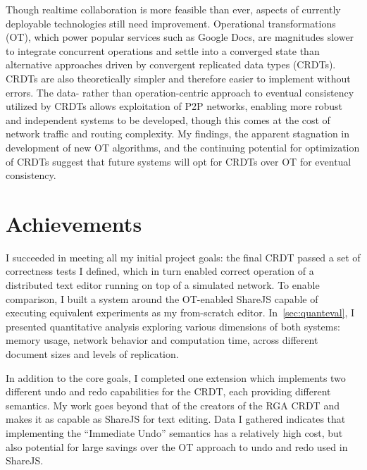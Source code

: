 \documentclass[12pt,a4paper,twoside,openright]{report}
\begin{document}
Though realtime collaboration is more feasible than ever, aspects of currently deployable technologies still need improvement. Operational transformations (OT), which power popular services such as Google Docs, are magnitudes slower to integrate concurrent operations and settle into a converged state than alternative approaches driven by convergent replicated data types (CRDTs). CRDTs are also theoretically simpler and therefore easier to implement without errors. The data- rather than operation-centric approach to eventual consistency utilized by CRDTs allows exploitation of P2P networks, enabling more robust and independent systems to be developed, though this comes at the cost of network traffic and routing complexity. My findings, the apparent stagnation in development of new OT algorithms, and the continuing potential for optimization of CRDTs suggest that future systems will opt for CRDTs over OT for eventual consistency.


\section{Achievements}

I succeeded in meeting all my initial project goals: the final CRDT passed a set of correctness tests I defined, which in turn enabled correct operation of a distributed text editor running on top of a simulated network. To enable comparison, I built a system around the OT-enabled ShareJS capable of executing equivalent experiments as my from-scratch editor. In~\cref{sec:quanteval}, I presented quantitative analysis exploring various dimensions of both systems: memory usage, network behavior and computation time, across different document sizes and levels of replication. 

In addition to the core goals, I completed one extension which implements two different undo and redo capabilities for the CRDT, each providing different semantics. My work goes beyond that of the creators of the RGA CRDT and makes it as capable as ShareJS for text editing. Data I gathered indicates that implementing the ``Immediate Undo'' semantics has a relatively high cost, but also potential for large savings over the OT approach to undo and redo used in ShareJS.
\end{document}
